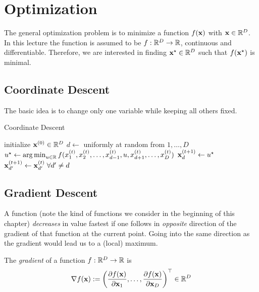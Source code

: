 \chapter{Optimization}
The general optimization problem is to minimize a function \(f(\boldsymbol{\mathrm{x}})\) with \(\boldsymbol{\mathrm{x}} \in \mathbb{R}^D\). In this lecture the function is assumed to be \(f: \mathbb{R}^D \to \mathbb{R}\), continuous and differentiable. Therefore, we are interested in finding \(\boldsymbol{\mathrm{x}}^\star \in \mathbb{R}^D\) such that \(f(\boldsymbol{\mathrm{x}}^\star)\) is minimal. 

\section{Coordinate Descent}
The basic idea is to change only one variable while keeping all others fixed.

\begin{algorithm}[H]
\caption{Coordinate Descent}
\begin{algorithmic}[1]
\State initialize \(\boldsymbol{\mathrm{x}}^{(0)} \in \mathbb{R}^D\)
	\State \(d \gets\) uniformly at random from \(1, \ldots, D\)
	\State \(u^\star \gets \operatorname*{arg\,min}_{u \in \mathbb{R}} f(x_1^{(t)}, x_2^{(t)}, \ldots, x_{d-1}^{(t)}, u, x_{d+1}^{(t)}, \ldots, x_D^{(t)})\)
	\State \(\boldsymbol{\mathrm{x}}_d^{(t+1)} \gets u^\star\) 
	\State \(\boldsymbol{\mathrm{x}}_{d'}^{(t+1)} \gets \boldsymbol{\mathrm{x}}_{d'}^{(t)} \; \forall d' \neq d\) 
\EndFor {}
\EndProcedure
\end{algorithmic}
\end{algorithm}

\section{Gradient Descent}
A function (note the kind of functions we consider in the beginning of this chapter) \emph{decreases} in value fastest if one follows in \emph{opposite} direction of the gradient of that function at the current point. Going into the same direction as the gradient would lead us to a (local) maximum.

The \emph{gradient} of a function \(f: \mathbb{R}^D \to \mathbb{R}\) is
\[
\nabla f(\boldsymbol{\mathrm{x}}) := \left( \frac{\partial f(\boldsymbol{\mathrm{x}})}{\partial \boldsymbol{\mathrm{x}}_1}, \ldots, \frac{\partial f(\boldsymbol{\mathrm{x}})}{\partial \boldsymbol{\mathrm{x}}_D} \right)^\top \in \mathbb{R}^D
\]

